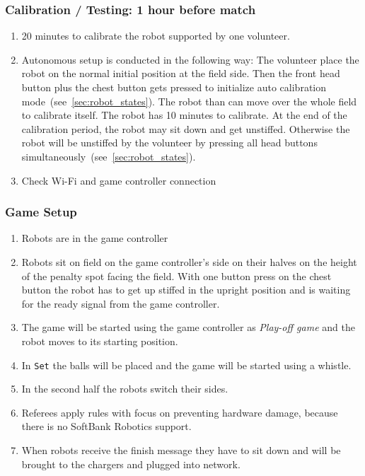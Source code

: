 \subsubsection{Calibration / Testing: 1 hour before match}
    \begin{enumerate}
        \item 20 minutes to calibrate the robot supported by one volunteer.
        \item Autonomous setup is conducted in the following way: The volunteer place the robot on the normal initial position at the field side. Then the front head button plus the chest button gets pressed to initialize auto calibration mode~(see~\ref{sec:robot_states}). The robot than can move over the whole field to calibrate itself. The robot has 10 minutes to calibrate. At the end of the calibration period, the robot may sit down and get unstiffed. Otherwise the robot will be unstiffed by the volunteer by pressing all head buttons simultaneously~(see~\ref{sec:robot_states}).  %

        \item  Check Wi-Fi and game controller connection
    \end{enumerate}

\subsubsection{Game Setup}

	\begin{enumerate}
		\item Robots are in the game controller
		\item Robots sit on field on the game controller's side on their halves on the height of the penalty spot facing the field. With one button press on the chest button the robot has to get up stiffed in the upright position and is waiting for the ready signal from the game controller.
		\item The game will be started using the game controller as \textit{Play-off game} and the robot moves to its starting position.
		\item In \texttt{Set} the balls will be placed and the game will be started using a whistle.
		\item In the second half the robots switch their sides.
		\item Referees apply rules with focus on preventing hardware damage, because there is no SoftBank Robotics support.
		\item When robots receive the finish message they have to sit down and will be brought to the chargers and plugged into network.
	\end{enumerate}
	
